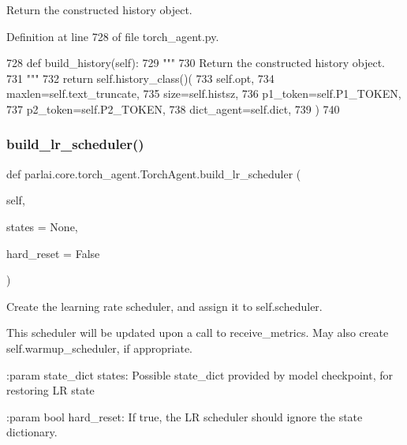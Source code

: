 \begin{DoxyVerb}Return the constructed history object.
\end{DoxyVerb}
 

Definition at line 728 of file torch\+\_\+agent.\+py.


\begin{DoxyCode}
728     \textcolor{keyword}{def }build\_history(self):
729         \textcolor{stringliteral}{"""}
730 \textcolor{stringliteral}{        Return the constructed history object.}
731 \textcolor{stringliteral}{        """}
732         \textcolor{keywordflow}{return} self.history\_class()(
733             self.opt,
734             maxlen=self.text\_truncate,
735             size=self.histsz,
736             p1\_token=self.P1\_TOKEN,
737             p2\_token=self.P2\_TOKEN,
738             dict\_agent=self.dict,
739         )
740 
\end{DoxyCode}
\mbox{\label{classparlai_1_1core_1_1torch__agent_1_1TorchAgent_aa51ac42dc34e3d2281a01cba78a96151}} 
\subsubsection{\texorpdfstring{build\+\_\+lr\+\_\+scheduler()}{build\_lr\_scheduler()}}
{\footnotesize\ttfamily def parlai.\+core.\+torch\+\_\+agent.\+Torch\+Agent.\+build\+\_\+lr\+\_\+scheduler (\begin{DoxyParamCaption}\item[{}]{self,  }\item[{}]{states = {\ttfamily None},  }\item[{}]{hard\+\_\+reset = {\ttfamily False} }\end{DoxyParamCaption})}

\begin{DoxyVerb}Create the learning rate scheduler, and assign it to self.scheduler.

This scheduler will be updated upon a call to receive_metrics.
May also create self.warmup_scheduler, if appropriate.

:param state_dict states: Possible state_dict provided by model
    checkpoint, for restoring LR state

:param bool hard_reset: If true, the LR scheduler should ignore the
    state dictionary.
\end{DoxyVerb}
 

